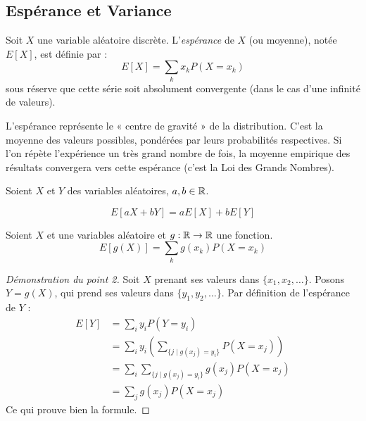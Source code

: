 \subsection{Espérance et Variance}

\begin{definition}
    Soit $X$ une variable aléatoire discrète. L'\emph{espérance} de $X$ (ou moyenne), notée $E[X]$, est définie par :
    \[
    E[X] = \sum_{k} x_k P(X = x_k)
    \]
    sous réserve que cette série soit absolument convergente (dans le cas d'une infinité de valeurs).
\end{definition}

\begin{remarque}
    L'espérance représente le « centre de gravité » de la distribution. C'est la moyenne des valeurs possibles, pondérées par leurs probabilités respectives. Si l'on répète l'expérience un très grand nombre de fois, la moyenne empirique des résultats convergera vers cette espérance (c'est la Loi des Grands Nombres).
\end{remarque}

\begin{proposition}[Linéarité]
    Soient $X$ et $Y$ des variables aléatoires, $a, b \in \mathbb{R}$.

     $$E[aX + bY] = aE[X] + bE[Y]$$
    
\end{proposition}

\begin{theoreme}
 Soient $X$ et une variables aléatoire et $g : \mathbb{R} \to \mathbb{R}$ une fonction.
    $$\displaystyle E[g(X)] = \sum_{k} g(x_k) P(X = x_k)$$
\end{theoreme}

\begin{proof}[Démonstration du point 2]
    Soit $X$ prenant ses valeurs dans $\{x_1, x_2, \dots\}$. Posons $Y = g(X)$, qui prend ses valeurs dans $\{y_1, y_2, \dots\}$. Par définition de l'espérance de $Y$ :
    \begin{align*}
        E[Y] &= \sum_{i} y_i P(Y = y_i) \\
        &= \sum_i y_i \left( \sum_{\{j \mid g(x_j) = y_i\}} P(X = x_j) \right) \\
        &= \sum_i \sum_{\{j \mid g(x_j) = y_i\}} g(x_j) P(X = x_j) \\
        &= \sum_j g(x_j) P(X = x_j)
    \end{align*}
    Ce qui prouve bien la formule.
\end{proof}

